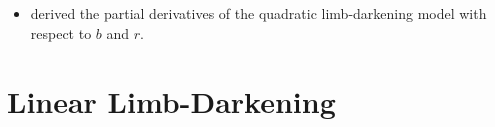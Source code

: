 \documentclass[modern]{aastex61}
\begin{document}
\begin{itemize}
\item \cite{Pal2008} derived the partial derivatives of the quadratic limb-darkening model
with respect to $b$ and $r$.
\end{itemize}

%
\section{Linear Limb-Darkening}
\label{sec:reparam}
\end{document}

